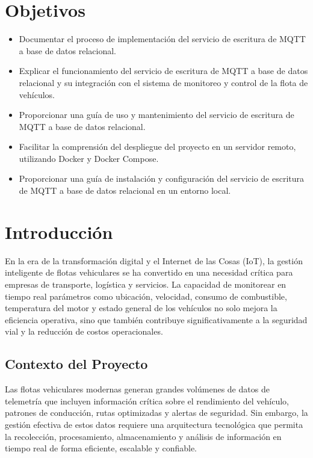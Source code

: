 \chapter{Objetivos}

\begin{itemize}[noitemsep]
    \item Documentar el proceso de implementación del servicio de escritura de MQTT a base de datos relacional.
    \item Explicar el funcionamiento del servicio de escritura de MQTT a base de datos relacional y su integración con el sistema de monitoreo y control de la flota de vehículos.
    \item Proporcionar una guía de uso y mantenimiento del servicio de escritura de MQTT a base de datos relacional.
    \item Facilitar la comprensión del despliegue del proyecto en un servidor remoto, utilizando Docker y Docker Compose.
    \item Proporcionar una guía de instalación y configuración del servicio de escritura de MQTT a base de datos relacional en un entorno local.
\end{itemize}

\chapter{Introducción}

En la era de la transformación digital y el Internet de las Cosas (IoT), la gestión inteligente de flotas vehiculares se ha convertido en una necesidad crítica para empresas de transporte, logística y servicios. La capacidad de monitorear en tiempo real parámetros como ubicación, velocidad, consumo de combustible, temperatura del motor y estado general de los vehículos no solo mejora la eficiencia operativa, sino que también contribuye significativamente a la seguridad vial y la reducción de costos operacionales.

\section{Contexto del Proyecto}

Las flotas vehiculares modernas generan grandes volúmenes de datos de telemetría que incluyen información crítica sobre el rendimiento del vehículo, patrones de conducción, rutas optimizadas y alertas de seguridad. Sin embargo, la gestión efectiva de estos datos requiere una arquitectura tecnológica que permita la recolección, procesamiento, almacenamiento y análisis de información en tiempo real
de forma eficiente, escalable y confiable.

